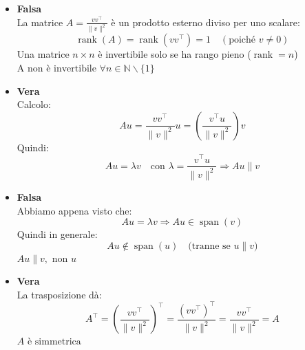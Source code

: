 \documentclass[12pt,a4paper]{article}
\begin{document}

\begin{itemize}
    \item[\boxed{\text{A}}] \textbf{Falsa} \\
    La matrice \( A = \frac{vv^\top}{\|v\|^2} \) è un prodotto esterno diviso per uno scalare:
    \[
    \operatorname{rank}(A) = \operatorname{rank}(vv^\top) = 1 \quad (\text{poiché } v \ne 0)
    \]
    Una matrice \( n \times n \) è invertibile solo se ha rango pieno (\( \operatorname{rank} = n \))\\
    \(\boxed{\text{A non è invertibile 
    $\forall n \in \mathbb{N}\backslash$\{1\}}}\)

    \item[\boxed{\text{B}}] \textbf{Vera} \\
    Calcolo:
    \[
    Au = \frac{vv^\top}{\|v\|^2} u = \left( \frac{v^\top u}{\|v\|^2} \right) v
    \]
    Quindi:
    \[
    \boxed{Au = \lambda v \quad \text{con } \lambda = \frac{v^\top u}{\|v\|^2}}
    \Rightarrow Au \parallel v
    \]

    \item[\boxed{\text{C}}] \textbf{Falsa} \\
    Abbiamo appena visto che:
    \[
    Au = \lambda v \Rightarrow Au \in \operatorname{span}(v)
    \]
    Quindi in generale:
    \[
    Au \not\in \operatorname{span}(u) \quad \text{(tranne se } u \parallel v)
    \]
    \(\boxed{Au \parallel v, \text{ non } u}\)

    \item[\boxed{\text{D}}] \textbf{Vera} \\
    La trasposizione dà:
    \[
    A^\top = \left( \frac{vv^\top}{\|v\|^2} \right)^\top = \frac{(vv^\top)^\top}{\|v\|^2} = \frac{vv^\top}{\|v\|^2} = A
    \]
    \(\boxed{A \text{ è simmetrica}}\)
\end{itemize}
\end{document}
